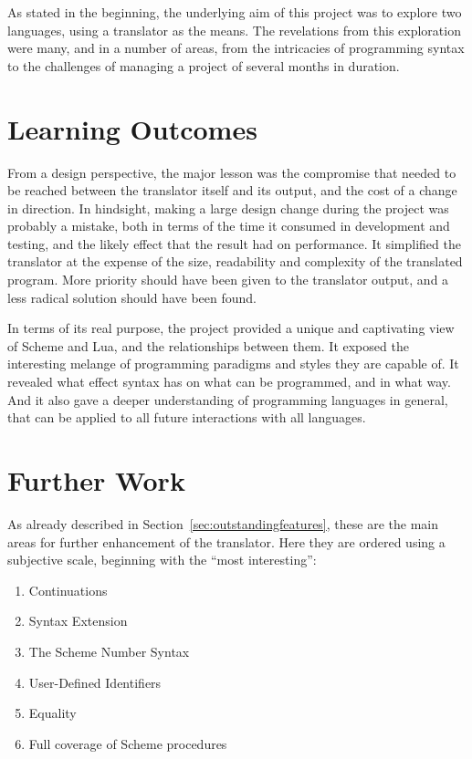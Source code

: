 As stated in the beginning, the underlying aim of this project was to explore
two languages, using a translator as the means. The revelations from this
exploration were many, and in a number of areas, from the intricacies of
programming syntax to the challenges of managing a project of several months in
duration.

\section{Learning Outcomes}

From a design perspective, the major lesson was the compromise that needed to
be reached between the translator itself and its output, and the cost of a
change in direction. In hindsight, making a large design change during the
project was probably a mistake, both in terms of the time it consumed in
development and testing, and the likely effect that the result had on
performance. It simplified the translator at the expense of the size,
readability and complexity of the translated program. More priority should have
been given to the translator output, and a less radical solution should have
been found.

In terms of its real purpose, the project provided a unique and captivating view
of Scheme and Lua, and the relationships between them. It exposed the
interesting melange of programming paradigms and styles they are capable of. It
revealed what effect syntax has on what can be programmed, and in what way. And
it also gave a deeper understanding of programming languages in general, that
can be applied to all future interactions with all languages.

\section{Further Work}

As already described in Section~\ref{sec:outstandingfeatures}, these are the
main areas for further enhancement of the translator. Here they are ordered
using a subjective scale, beginning with the ``most interesting'':
\begin{enumerate}
\item Continuations
\item Syntax Extension
\item The Scheme Number Syntax
\item User-Defined Identifiers
\item Equality
\item Full coverage of Scheme procedures
\end{enumerate}


